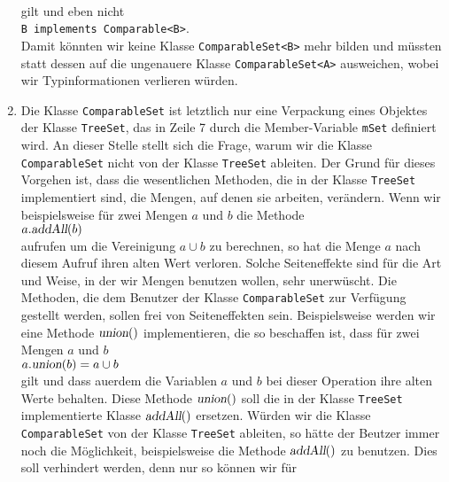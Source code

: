 \begin{enumerate}
      \\[0.2cm]
      gilt und eben nicht
      \\[0.2cm]
      \hspace*{1.3cm}
      \texttt{B implements Comparable<B>}.
      \\[0.2cm]
      Damit k\"onnten wir keine Klasse \texttt{ComparableSet<B>} mehr bilden und
      m\"ussten statt dessen auf die ungenauere Klasse \texttt{ComparableSet<A>} ausweichen,
      wobei  wir Typinformationen verlieren w\"urden.
\item Die Klasse \texttt{ComparableSet} ist letztlich nur eine Verpackung eines 
      Objektes der Klasse \texttt{TreeSet}, das in Zeile 7 durch die Member-Variable
      \texttt{mSet}  definiert wird.  An dieser Stelle stellt sich die Frage,
      warum wir die Klasse \texttt{ComparableSet} nicht von der Klasse \texttt{TreeSet}
      ableiten.  Der Grund f\"ur dieses Vorgehen ist, dass die wesentlichen Methoden, die in der
      Klasse \texttt{TreeSet} implementiert sind, die Mengen, auf denen sie arbeiten,
      ver\"andern.  Wenn wir beispielsweise f\"ur zwei Mengen $a$ und $b$ die Methode
      \\[0.2cm]
      \hspace*{1.3cm}
      $a.\textsl{addAll}(b)$
      \\[0.2cm]
      aufrufen um die Vereinigung $a \cup b$ zu berechnen, so hat die Menge $a$ nach
      diesem Aufruf ihren alten Wert verloren.  Solche Seiteneffekte sind f\"ur die Art und
      Weise, in der wir Mengen benutzen wollen, sehr unerw\"uscht.  Die Methoden, die dem
      Benutzer der Klasse \texttt{ComparableSet} zur Verf\"ugung gestellt werden, sollen
      frei von Seiteneffekten sein.  Beispielsweise werden wir eine Methode $\textsl{union}()$
      implementieren, die so beschaffen ist, dass f\"ur zwei Mengen $a$ und $b$
      \\[0.2cm]
      \hspace*{1.3cm}
      $a.\textsl{union}(b) = a \cup b$
      \\[0.2cm]
      gilt und dass au\3erdem die Variablen $a$ und $b$ bei dieser Operation ihre alten Werte behalten.
      Diese Methode $\textsl{union}()$ soll die in der Klasse \texttt{TreeSet} implementierte Klasse
      $\textsl{addAll}()$ ersetzen.  W\"urden wir die Klasse \texttt{ComparableSet} von der Klasse
      \texttt{TreeSet} ableiten, so h\"atte der Beutzer immer noch die M\"oglichkeit, beispielsweise die
      Methode $\textsl{addAll}()$ zu benutzen.  Dies soll verhindert werden, denn nur so k\"onnen wir f\"ur

\end{enumerate}
